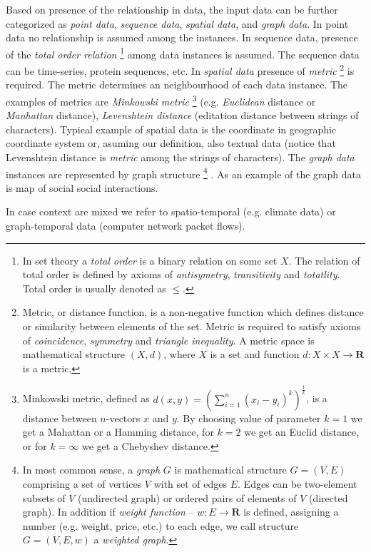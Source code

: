 Based on presence of the relationship in data, the input data can be further categorized as
\emph{point data}, \emph{sequence data}, \emph{spatial data}, and \emph{graph data}. 
In point data no relationship is assumed among the instances.
In sequence data, presence of the \emph{total order relation}%
\footnote{%
 	In set theory a \emph{total order} is a binary relation on some set $X$. 
	The relation of total order is defined by axioms of \emph{antisymetry}, \emph{transitivity} 
	and \emph{totatlity}. Total order is usually denoted as $\le$.
} %
among data instances is assumed. The sequence data can be time-series, protein sequences, etc.
In \emph{spatial data} presence of \emph{metric}%
\footnote{
	Metric, or distance function, is a non-negative function which defines distance or 
	similarity between elements of the set. Metric is required to satisfy axioms of
	\emph{coincidence}, \emph{symmetry} and \emph{triangle inequality}.
	A metric space is mathematical structure $(X,d)$, where $X$ is a set and function  
	$d:X \times X \rightarrow \mathbf{R}$ is a metric. 
} %
is required. 
The metric determines an neighbourhood of each data instance. The examples of metrics are
\emph{Minkowski metric}%
\footnote{
	Minkowski metric, defined as $ d(x,y) = (\sum_{i=1}^n(x_i-y_i)^k )^\frac{1}{k}$, 
	is a distance between $n$-vectors $x$ and $y$.
	By choosing value of parameter $k=1$ we get a Mahattan or  a Hamming distance, 
	for $k=2$ we get an Euclid distance, or for $k=\infty $ we get a Chebyshev distance.
} %
(e.g. \emph{Euclidean} distance or \emph{Manhattan} distance), \emph{Levenshtein distance}
(editation distance between strings of characters). Typical example of spatial data is the
coordinate in geographic coordinate system or, asuming our definition, also textual data 
(notice that Levenshtein distance is \emph{metric} among the strings of characters).
The \emph{graph data} instances are represented by graph structure%
\footnote{
	In most common sense, a \emph{graph} $G$ is mathematical structure $G=\left(V,E\right)$
	comprising a set of vertices $V$ with set of edges $E$.
	Edges can be two-element subsets of  $V$ (undirected graph) or ordered pairs 
	of elements of $V$ (directed graph).
	In addition if \emph{weight function} -- $w:E\rightarrow \mathbf{R} $ is defined, 
	assigning a number (e.g. weight, price, etc.) to each edge, we call structure
	$G=\left( V,E,w \right)$ a \emph{weighted graph}.
}%
. As an example of the graph data is map of social social interactions.

In case context are mixed we refer to spatio-temporal (e.g. climate data) or 
graph-temporal data (computer network packet flows).

